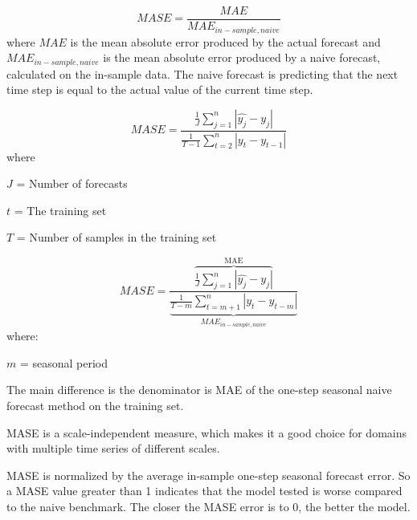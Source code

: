 \begin{displaymath}
  MASE = \frac{MAE}{MAE_{in-sample, naive}}
\end{displaymath}
where $MAE$ is the mean absolute error
produced by the actual forecast and
$MAE_{in-sample, naive} $
is the mean absolute error produced by
a naive forecast, calculated on the in-sample data.
The naive forecast is predicting that the next
time step is equal to the actual value of the current time step.


\begin{displaymath}
  \label{eq:MASE}
  MASE = \frac{\frac{1}{J} \sum_{j=1}^n |\hat{y_j} - y_j|}{\frac{1}{T-1} \sum_{t=2}^n |y_t - y_{t-1}|}
\end{displaymath}
where

$J$ = Number of forecasts

$t$ = The training set

$T$ = Number of samples in the training set

\begin{equation}
  \label{eq:MASE-Seasonal}
  MASE = \frac{
    \overbrace{
      \frac{1}{J} \sum_{j=1}^n |\hat{y_j} - y_j|}^\text{MAE}}{
    \underbrace{
      \frac{1}{T-m} \sum_{t=m+1}^n |y_t - y_{t-m}|}_\text{$MAE_{in-sample, naive}$}
  }
\end{equation}
where:

$m$ = seasonal period

The main difference is the denominator is MAE
of the one-step seasonal naive forecast method on the training set.

MASE is a scale-independent measure, which makes it
a good choice for domains with multiple time series of
different scales.

MASE is normalized by the average in-sample one-step
seasonal forecast error. So a MASE value greater than
1 indicates that the model tested is worse compared
to the naive benchmark.
The closer the MASE error is to 0, the better the model.



\iffalse
\subsubsection{RMSE}
\todo[inline]{TODO}

\subsubsection{$R^2$}
\todo[inline]{TODO}
\fi

